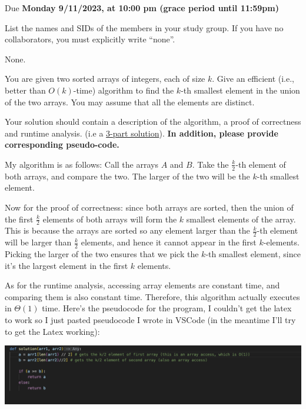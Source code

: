 \documentclass[11pt]{article}
\def\duedate{Monday 9/11/2023, at 10:00 pm (grace period until 11:59pm)}
\begin{document}
\maketitle
Due \textbf{\duedate}

List the names and SIDs of the members in your study group.
If you have no collaborators, you must explicitly write ``none''.

\begin{solution}
	None.
\end{solution}


You are given two sorted arrays of integers, each of size $k$. 
Give an efficient (i.e., better than $O(k)$-time) algorithm to find the $k$-th smallest element in the union of the two arrays. You may assume that all the elements are distinct. 

Your solution should contain a description of the algorithm, a proof of correctness and runtime analysis. (i.e a \href{https://cs170.org/resources/homework-guidelines/}{ 3-part solution}). \textbf{In addition, please provide corresponding pseudo-code.}

\begin{solution}
	My algorithm is as follows: Call the arrays $A$ and $B$. Take the $\frac{k}{2}$-th element of both arrays, 
	and compare the two. The larger of the two will be the $k$-th smallest element. 

	Now for the proof of correctness: since both arrays are sorted, then the union of the first 
	$\frac{k}{2}$ elements of both arrays will form the $k$ smallest elements of the array. This is because 
	the arrays are sorted so any element larger than the $\frac{k}{2}$-th element will be larger than 
	$\frac{k}{2}$ elements, and hence it cannot appear in the first $k$-elements. Picking the larger of the two
	ensures that we pick the $k$-th smallest element, since it's the largest element in the first $k$ elements.

	As for the runtime analysis, accessing array elements are constant time, and comparing them is also 
	constant time. Therefore, this algorithm actually executes in $\Theta(1)$ time. Here's the pseudocode 
	for the program, I couldn't get the latex to work so I just pasted pseudocode I wrote in VSCode 
	(in the meantime I'll try to get the Latex working):

	\begin{center}
		\includegraphics[scale=0.5]{code.png}
	\end{center}
\end{solution}
\pagebreak
{}
\end{document}
